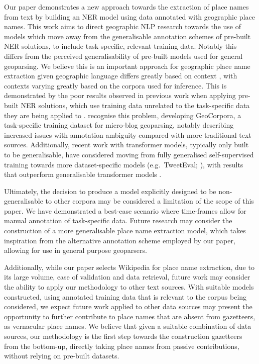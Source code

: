 \documentclass[]{interact}
\theoremstyle{plain}%
\theoremstyle{definition}
\theoremstyle{remark}
\begin{document}
Our paper demonstrates a new approach towards the extraction of place
names from text by building an NER model using data annotated with
geographic place names. This work aims to direct geographic NLP research
towards the use of models which move away from the generalisable
annotation schemes of pre-built NER solutions, to include task-specific,
relevant training data. Notably this differs from the perceived
generalisability of pre-built models used for general geoparsing. We
believe this is an important approach for geographic place name
extraction given geographic language differs greatly based on context
\citep{purves2018}, with contexts varying greatly based on the corpora
used for inference. This is demonstrated by the poor results observed in
previous work when applying pre-built NER solutions, which use training
data unrelated to the task-specific data they are being applied to
\citep{hu2019, karimzadeh2019}. \citet{wallgrun2018} recognise this
problem, developing GeoCorpora, a task-specific training dataset for
micro-blog geoparsing, notably describing increased issues with
annotation ambiguity compared with more traditional text-sources.
Additionally, recent work with transformer models, typically only built
to be generalisable, have considered moving from fully generalised
self-supervised training towards more dataset-specific models
(e.g.~TweetEval; \citet{barbieri2020}), with results that outperform
generalisable transformer models \citep{nguyen2020}.

Ultimately, the decision to produce a model explicitly designed to be
non-generalisable to other corpora may be considered a limitation of the
scope of this paper. We have demonstrated a best-case scenario where
time-frames allow for manual annotation of task-specific data. Future
research may consider the construction of a more generalisable place
name extraction model, which takes inspiration from the alternative
annotation scheme employed by our paper, allowing for use in general
purpose geoparsers.

Additionally, while our paper selects Wikipedia for place name
extraction, due to its large volume, ease of validation and data
retrieval, future work may consider the ability to apply our methodology
to other text sources. With suitable models constructed, using annotated
training data that is relevant to the corpus being considered, we expect
future work applied to other data sources may present the opportunity to
further contribute to place names that are absent from gazetteers, as
vernacular place names. We believe that given a suitable combination of
data sources, our methodology is the first step towards the construction
gazetteers from the bottom-up, directly taking place names from passive
contributions, without relying on pre-built datasets.
\end{document}
